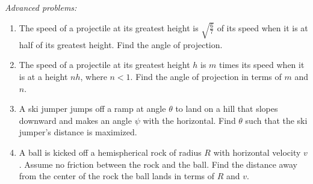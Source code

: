 \documentclass[12pt]{article}
\begin{document}
\emph{Advanced problems:}
\begin{enumerate}
\item
The speed of a projectile at its greatest height is $\sqrt{\frac{6}{7}}$ of its speed when it is at half of its greatest height. Find the angle of projection.

\item
The speed of a projectile at its greatest height $h$ is $m$ times its speed when it is at a height $nh$, where $n < 1$. Find the angle of projection in terms of $m$ and $n$.

\item
A ski jumper jumps off a ramp at angle $\theta$ to land on a hill that slopes downward and makes an angle $\psi$ with the horizontal. Find $\theta$ such that the ski jumper's distance is maximized.

\item
A ball is kicked off a hemispherical rock of radius $R$ with horizontal velocity $v$. Assume no friction between the rock and the ball. Find the distance away from the center of the rock the ball lands in terms of $R$ and $v$.
\end{enumerate}
\end{document}
